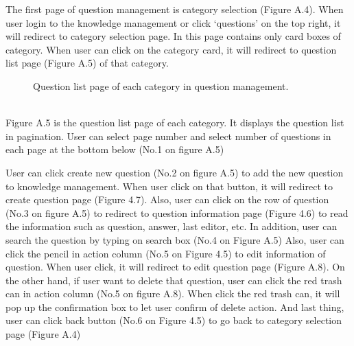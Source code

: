 \documentclass[12pt,oneside,openright,a4paper]{cpe-english-project}
\begin{document}
The first page of question management is category selection (Figure A.4). When user 
login to the knowledge management or click ‘questions’ on the top right, it will redirect to 
category selection page. In this page contains only card boxes of category. When user can 
click on the category card, it will redirect to question list page (Figure A.5) of that category.
\begin{figure}[!h]\centering
{}
\caption{Question list page of each category in question management.
}\label{fig:Question list page of each category in question management.
}
\end{figure}\\

Figure A.5 is the question list page of each category. It displays the question list in 
pagination. User can select page number and select number of questions in each page at the 
bottom below (No.1 on figure A.5)

User can click create new question (No.2 on figure A.5) to add the new question to 
knowledge management. When user click on that button, it will redirect to create question 
page (Figure 4.7). Also, user can click on the row of question (No.3 on figure A.5) to redirect 
to question information page (Figure 4.6) to read the information such as question, answer, 
last editor, etc. In addition, user can search the question by typing on search box (No.4 on 
Figure A.5)
Also, user can click the pencil in action column (No.5 on Figure 4.5) to edit 
information of question. When user click, it will redirect to edit question page (Figure A.8). 
On the other hand, if user want to delete that question, user can click the red trash can in 
action column (No.5 on figure A.8). When click the red trash can, it will pop up the 
confirmation box to let user confirm of delete action.
And last thing, user can click back button (No.6 on Figure 4.5) to go back to category 
selection page (Figure A.4)
\end{document}
